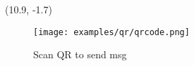 

\begin{textblock}{0.5}(10.9, -1.7)
    \begin{figure}
    \texttt{[image: examples/qr/qrcode.png]}
    \setlength{\abovecaptionskip}{-27pt}
    \captionsetup[figure]{font=footnotesize}
    \captionsetup{width=4.5\linewidth}
    \caption*{Scan QR to send msg}
    \end{figure}
\end{textblock}